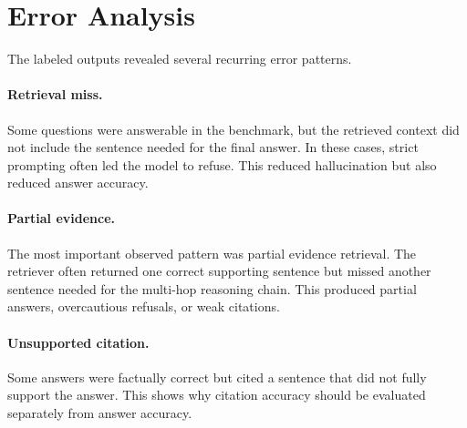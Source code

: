 \documentclass[10pt,twocolumn]{article}
\begin{document}
\begin{table}[!htbp]
\centering
\scriptsize
\setlength{\tabcolsep}{3pt}
\caption{First-20 comparison with partial-credit scores.}
\label{tab:first20-full}
\end{table}

\section{Error Analysis}

The labeled outputs revealed several recurring error patterns.

\paragraph{Retrieval miss.}
Some questions were answerable in the benchmark, but the retrieved context did not include the sentence needed for the final answer. In these cases, strict prompting often led the model to refuse. This reduced hallucination but also reduced answer accuracy.

\paragraph{Partial evidence.}
The most important observed pattern was partial evidence retrieval. The retriever often returned one correct supporting sentence but missed another sentence needed for the multi-hop reasoning chain. This produced partial answers, overcautious refusals, or weak citations.

\paragraph{Unsupported citation.}
Some answers were factually correct but cited a sentence that did not fully support the answer. This shows why citation accuracy should be evaluated separately from answer accuracy.
\end{document}
